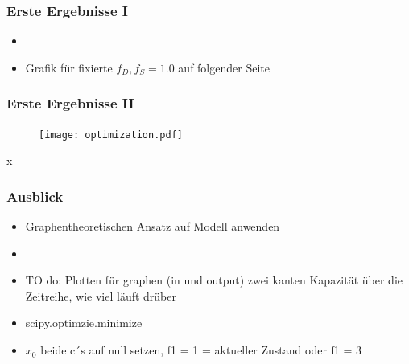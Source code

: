 \documentclass[aspectratio=169,t]{beamer}
\begin{document}
	\begin{frame}
		\frametitle{Erste Ergebnisse I}
		\begin{itemize}
			\item 
			\item Grafik für fixierte $f_D, f_S = 1.0$ auf folgender Seite
		\end{itemize}
		\vspace*{-2cm}
	\end{frame}

	\begin{frame}
		\frametitle{Erste Ergebnisse II}
		\vspace*{-1.6cm}
		\begin{figure}
			\hspace*{3.5cm}\texttt{[image: optimization.pdf]}
		\end{figure}x
	\end{frame}
	
	\begin{frame}
		\frametitle{Ausblick}
		\begin{itemize}
			\item Graphentheoretischen Ansatz auf Modell anwenden
			\item
			\item TO do: Plotten für graphen (in und output) zwei kanten Kapazität über die Zeitreihe, wie viel läuft drüber 
			\item scipy.optimzie.minimize
			\item $x_0$ beide c´s auf null setzen, f1 = 1 = aktueller Zustand oder f1 = 3
			
		\end{itemize}
	\end{frame}
	
	


	
	

	
	
\end{document}
